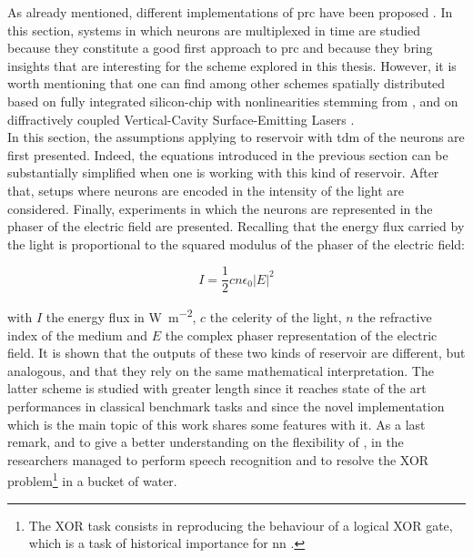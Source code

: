 \label{prc}

As already mentioned, different implementations of \gls{prc} have been proposed \cite{VanderSande2017}. In this section, systems in which neurons are multiplexed in time are studied because they constitute a good first approach to \gls{prc} and because they bring insights that are interesting for the scheme explored in this thesis. However, it is worth mentioning that one can find among other schemes spatially distributed \rcer based on fully integrated silicon-chip with nonlinearities stemming from  \cite{Vandoorne2014}, and on diffractively coupled Vertical-Cavity Surface-Emitting Lasers \cite{Brunner2015}. \\

In this section, the assumptions applying to reservoir with \gls{tdm} of the neurons are first presented. Indeed, the equations introduced in the previous section can be substantially simplified when one is working with this kind of reservoir. After that, setups where neurons are encoded in the intensity of the light are considered. Finally, experiments in which the neurons are represented in the phaser of the electric field are presented. Recalling that the energy flux carried by the light is proportional to the squared modulus of the phaser of the electric field:

\begin{equation}
	I = \frac{1}{2}cn\epsilon_0 |E|^2
\end{equation}

with $I$ the energy flux in \si{\watt\per\metre\squared}, $c$ the celerity of the light, $n$ the refractive index of the medium and $E$ the complex phaser representation of the electric field. It is shown that the outputs of these two kinds of reservoir are different, but analogous, and that they rely on the same mathematical interpretation. The latter scheme is studied with greater length since it reaches state of the art performances in classical benchmark tasks and since the novel implementation which is the main topic of this work shares some features with it. As a last remark, and to give a better understanding on the flexibility of \rcer, in \cite{Fernando2003} the researchers managed to perform speech recognition and to resolve the XOR problem\footnote{The XOR task consists in reproducing the behaviour of a logical XOR gate, which is a task of historical importance for \gls{nn} \cite{minsky1969perceptrons}.} in a bucket of water.\\

